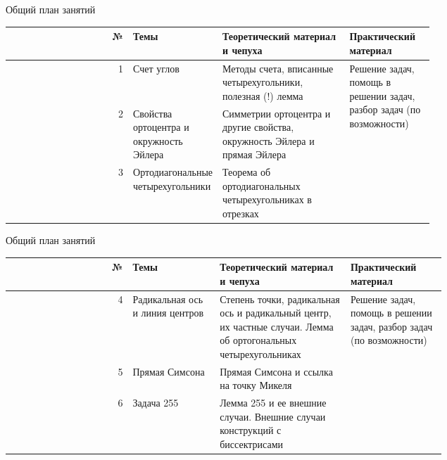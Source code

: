 \documentclass[12pt, aspectratio=169]{beamer}
\begin{document}
\begin{frame}{Общий план занятий}
    \begin{table}[ht]
        \centering
        \begin{tabular}{|r|p{0.2\linewidth}|p{0.3\linewidth}|p{0.2\linewidth}|}
            \hline
            
            \textbf{№} & \textbf{Темы} & \textbf{Теоретический материал и чепуха} & \textbf{Практический материал} \\
            
            \hline
            
            1 & Счет углов & Методы счета, вписанные четырехугольники, полезная (!) лемма & \multirow{3}{\linewidth}{Решение задач, помощь в решении задач, разбор задач (по возможности)} \\ \cline{1-3}
            2 & Свойства ортоцентра и окружность Эйлера & Симметрии ортоцентра и другие свойства, окружность Эйлера и прямая Эйлера  & \\ \cline{1-3}
            3 & О\-рто\-ди\-а\-го\-на\-ль\-ны\-е четырехугольники & Теорема об ортодиагональных четырехугольниках в отрезках &  \\ \hline
        \end{tabular}
    \end{table}
\end{frame}
\addtocounter{framenumber}{-1}

\begin{frame}{Общий план занятий}
    \begin{table}[ht]
        \centering
        \begin{tabular}{|r|p{0.2\linewidth}|p{0.3\linewidth}|p{0.22\linewidth}|}
            \hline
            \textbf{№} & \textbf{Темы} & \textbf{Теоретический материал и чепуха} & \textbf{Практический материал} \\ \hline
            4 & Радикальная ось и линия центров & Степень точки, радикальная ось и радикальный центр, их частные случаи. Лемма об ортогональных четырехугольниках & \multirow{3}{\linewidth}{Решение задач, помощь в решении задач, разбор задач (по возможности)} \\ \cline{1-3}  
            5 & Прямая Симсона & Прямая Симсона и ссылка на точку Микеля &  \\ \cline{1-3}
            6 & Задача 255 & Лемма 255 и ее внешние случаи. Внешние случаи конструкций с биссектрисами &  \\ \hline
        \end{tabular}
    \end{table}
\end{frame}
\end{document}

